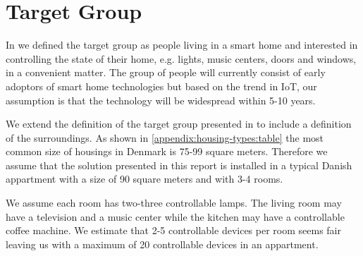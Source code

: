\section{Target Group}
\label{sec:target-group}

In \cite[p. 15]{prespecialisation} we defined the target group as people living in a smart home and interested in controlling the state of their home, e.g. lights, music centers, doors and windows, in a convenient matter. The group of people will currently consist of early adoptors of smart home technologies but based on the trend in IoT, our assumption is that the technology will be widespread within 5-10 years. 

We extend the definition of the target group presented in \cite[p. 15]{prespecialisation} to include a definition of the surroundings. As shown in \cref{appendix:housing-types:table} the most common size of housings in Denmark is 75-99 square meters. Therefore we assume that the solution presented in this report is installed in a typical Danish appartment with a size of 90 square meters and with 3-4 rooms. 

We assume each room has two-three controllable lamps. The living room may have a television and a music center while the kitchen may have a controllable coffee machine. We estimate that 2-5 controllable devices per room seems fair leaving us with a maximum of 20 controllable devices in an appartment.

